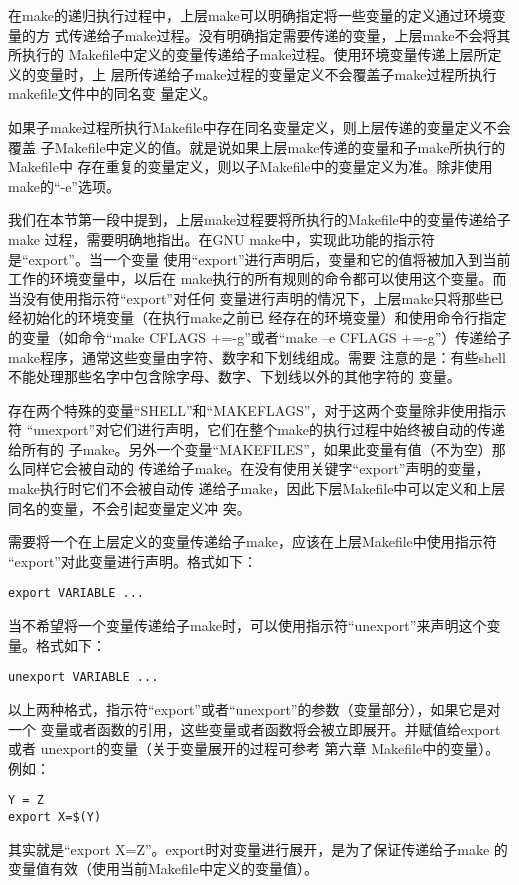 在make的递归执行过程中，上层make可以明确指定将一些变量的定义通过环境变量的方
式传递给子make过程。没有明确指定需要传递的变量，上层make不会将其所执行的
Makefile中定义的变量传递给子make过程。使用环境变量传递上层所定义的变量时，上
层所传递给子make过程的变量定义不会覆盖子make过程所执行makefile文件中的同名变
量定义。

如果子make过程所执行Makefile中存在同名变量定义，则上层传递的变量定义不会覆盖
子Makefile中定义的值。就是说如果上层make传递的变量和子make所执行的Makefile中
存在重复的变量定义，则以子Makefile中的变量定义为准。除非使用make的“-e”选项。

我们在本节第一段中提到，上层make过程要将所执行的Makefile中的变量传递给子make
过程，需要明确地指出。在GNU make中，实现此功能的指示符是“export”。当一个变量
使用“export”进行声明后，变量和它的值将被加入到当前工作的环境变量中，以后在
make执行的所有规则的命令都可以使用这个变量。而当没有使用指示符“export”对任何
变量进行声明的情况下，上层make只将那些已经初始化的环境变量（在执行make之前已
经存在的环境变量）和使用命令行指定的变量（如命令“make CFLAGS +=-g”或者“make
–e CFLAGS +=-g”）传递给子make程序，通常这些变量由字符、数字和下划线组成。需要
注意的是：有些shell不能处理那些名字中包含除字母、数字、下划线以外的其他字符的
变量。

存在两个特殊的变量“SHELL”和“MAKEFLAGS”，对于这两个变量除非使用指示符
“unexport”对它们进行声明，它们在整个make的执行过程中始终被自动的传递给所有的
子make。另外一个变量“MAKEFILES”，如果此变量有值（不为空）那么同样它会被自动的
传递给子make。在没有使用关键字“export”声明的变量，make执行时它们不会被自动传
递给子make，因此下层Makefile中可以定义和上层同名的变量，不会引起变量定义冲
突。

需要将一个在上层定义的变量传递给子make，应该在上层Makefile中使用指示符
“export”对此变量进行声明。格式如下：
\begin{Verbatim}[]
export VARIABLE ...
\end{Verbatim}

当不希望将一个变量传递给子make时，可以使用指示符“unexport”来声明这个变量。格式如下：
\begin{Verbatim}[]
unexport VARIABLE ...
\end{Verbatim}

以上两种格式，指示符“export”或者“unexport”的参数（变量部分），如果它是对一个
变量或者函数的引用，这些变量或者函数将会被立即展开。并赋值给export或者
unexport的变量（关于变量展开的过程可参考 第六章 Makefile中的变量）。例如：
\begin{Verbatim}[]
Y = Z
export X=$(Y)
\end{Verbatim}
\noindent
其实就是“export X=Z”。export时对变量进行展开，是为了保证传递给子make
的变量值有效（使用当前Makefile中定义的变量值）。


